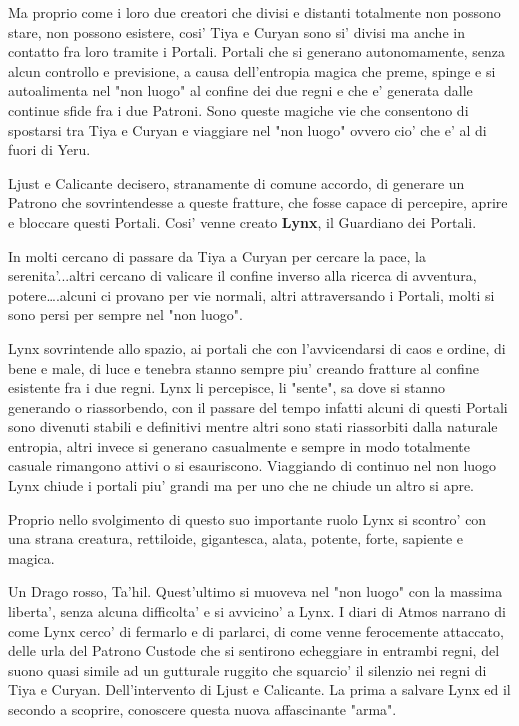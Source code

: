 \documentclass[a4paper,11pt,twoside,openany]{book}
\begin{document}
{Ma proprio come i loro due creatori che divisi e distanti totalmente non possono stare, non possono esistere, cosi' Tiya e Curyan sono si' divisi ma anche in contatto fra loro tramite i Portali. Portali che si generano autonomamente, senza alcun controllo e previsione, a causa dell'entropia magica che preme, spinge e si autoalimenta nel "non luogo" al confine dei due regni e che e' generata dalle continue sfide fra i due Patroni. Sono queste magiche vie che consentono di spostarsi tra Tiya e Curyan e viaggiare nel "non luogo" ovvero cio' che e' al di fuori di Yeru.

Ljust e Calicante decisero, stranamente di comune accordo, di generare un Patrono che sovrintendesse a queste fratture, che fosse capace di percepire, aprire e bloccare questi Portali. Cosi' venne creato \textbf{Lynx}, il Guardiano dei Portali.

In molti cercano di passare da Tiya a Curyan per cercare la pace, la serenita'...altri cercano di valicare il confine inverso alla ricerca di avventura, potere\ldots .alcuni ci provano per vie normali, altri attraversando i Portali, molti si sono persi per sempre nel "non luogo".

Lynx sovrintende allo spazio, ai portali che con l'avvicendarsi di caos e ordine, di bene e male, di luce e tenebra stanno sempre piu' creando fratture al confine esistente fra i due regni. Lynx li percepisce, li "sente", sa dove si stanno generando o riassorbendo, con il passare del tempo infatti alcuni di questi Portali sono divenuti stabili e definitivi mentre altri sono stati riassorbiti dalla naturale entropia, altri invece si generano casualmente e sempre in modo totalmente casuale rimangono attivi o si esauriscono. Viaggiando di continuo nel non luogo Lynx chiude i portali piu' grandi ma per uno che ne chiude un altro si apre.

Proprio nello svolgimento di questo suo importante ruolo Lynx si scontro' con una strana creatura, rettiloide, gigantesca, alata, potente, forte, sapiente e magica.

Un Drago rosso, Ta'hil. Quest'ultimo si muoveva nel "non luogo" con la massima liberta', senza alcuna difficolta' e si avvicino' a Lynx. I diari di Atmos narrano di come Lynx cerco' di fermarlo e di parlarci, di come venne ferocemente attaccato, delle urla del Patrono Custode che si sentirono echeggiare in entrambi regni, del suono quasi simile ad un gutturale ruggito che squarcio' il silenzio nei regni di Tiya e Curyan. Dell'intervento di Ljust e Calicante. La prima a salvare Lynx ed il secondo a scoprire, conoscere questa nuova affascinante "arma".

}
\end{document}
